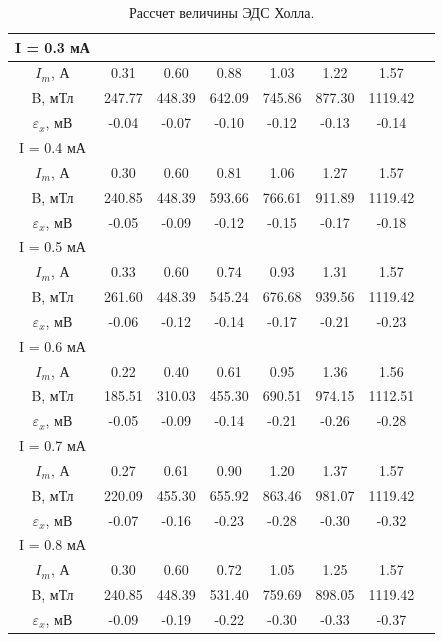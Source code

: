 \documentclass [a4paper,12pt]{article}
\begin{document}
\begin{table}[H]
\caption{\label{tab:canonsummary} Рассчет величины ЭДС Холла.}
\begin{center}
\begin{tabular}{|c|c|c|c|c|c|c|c|}
\hline
I = 0.3 мА&&&&&&\\
\hline
$I_m$, А & 0.31 & 0.60 & 0.88 & 1.03 & 1.22 & 1.57 \\
\hline
B, мТл & 247.77 & 448.39 & 642.09 & 745.86 & 877.30 & 1119.42 \\ 
\hline
$\varepsilon_x$, мВ & -0.04 & -0.07 & -0.10 & -0.12 & -0.13 & -0.14 \\ 
\hline
I = 0.4 мА&&&&&&\\
\hline
$I_m$, А & 0.30 & 0.60 & 0.81 & 1.06 & 1.27 & 1.57 \\
\hline
B, мТл & 240.85 & 448.39 & 593.66 & 766.61 & 911.89 & 1119.42 \\
\hline
$\varepsilon_x$, мВ & -0.05 & -0.09 & -0.12 & -0.15 & -0.17 & -0.18 \\ 
\hline
I = 0.5 мА&&&&&&\\
\hline
$I_m$, А & 0.33 & 0.60 & 0.74 & 0.93 & 1.31 & 1.57 \\ 
\hline
B, мТл & 261.60 & 448.39 & 545.24 & 676.68 & 939.56 & 1119.42\\ 
\hline
$\varepsilon_x$, мВ & -0.06 & -0.12 & -0.14 & -0.17 & -0.21 & -0.23 \\
\hline
I = 0.6 мА&&&&&&\\
\hline
$I_m$, А & 0.22 & 0.40 & 0.61 & 0.95 & 1.36 & 1.56 \\ 
\hline
B, мТл & 185.51 & 310.03 & 455.30 & 690.51 & 974.15 & 1112.51 \\ 
\hline
$\varepsilon_x$, мВ & -0.05 & -0.09 & -0.14 & -0.21 & -0.26 & -0.28 \\ 
\hline
I = 0.7 мА&&&&&&\\
\hline
$I_m$, А & 0.27 & 0.61 & 0.90 & 1.20 & 1.37 & 1.57 \\
\hline
B, мТл & 220.09 & 455.30 & 655.92 & 863.46 & 981.07 & 1119.42 \\ 
\hline
$\varepsilon_x$, мВ & -0.07 & -0.16 & -0.23 & -0.28 & -0.30 & -0.32 \\
\hline
I = 0.8 мА&&&&&&\\
\hline
$I_m$, А & 0.30 & 0.60 & 0.72 & 1.05 & 1.25 & 1.57 \\
\hline
B, мТл & 240.85 & 448.39 & 531.40 & 759.69 & 898.05 & 1119.42 \\ 
\hline
$\varepsilon_x$, мВ & -0.09 & -0.19 & -0.22 & -0.30 & -0.33 & -0.37 \\

\end{tabular}
\end{center}
\end{table}
\end{document}
